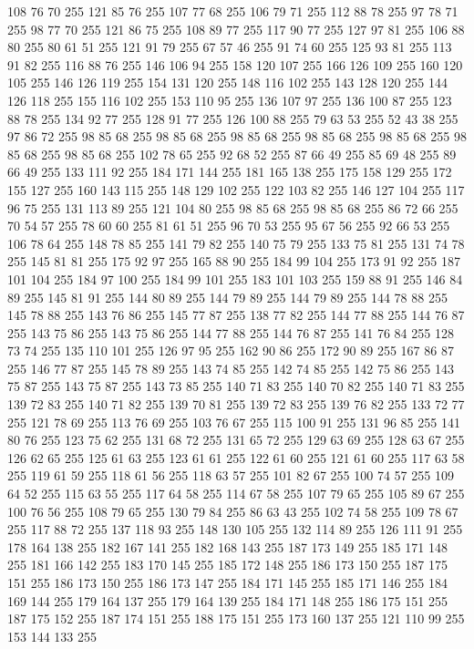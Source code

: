 108 76 70 255 121 85 76 255 107 77 68 255 106 79 71 255 112 88 78 255 97 78 71 255 98 77 70 255 121 86 75 255 108 89 77 255 117 90 77 255 127 97 81 255 106 88 80 255 80 61 51 255 121 91 79 255 67 57 46 255 91 74 60 255 125 93 81 255 113 91 82 255 116 88 76 255 146 106 94 255 158 120 107 255 166 126 109 255 160 120 105 255 146 126 119 255 154 131 120 255 148 116 102 255 143 128 120 255 144 126 118 255 155 116 102 255 153 110 95 255 136 107 97 255 136 100 87 255 123 88 78 255 134 92 77 255 128 91 77 255 126 100 88 255 79 63 53 255 52 43 38 255 97 86 72 255 98 85 68 255 98 85 68 255 98 85 68 255 98 85 68 255 98 85 68 255 98 85 68 255 98 85 68 255 102 78 65 255 92 68 52 255 87 66 49 255 85 69 48 255 89 66 49 255 133 111 92 255 184 171 144 255 181 165 138 255 175 158 129 255 172 155 127 255 160 143 115 255 148 129 102 255 122 103 82 255 146 127 104 255 117 96 75 255 131 113 89 255 121 104 80 255 98 85 68 255
98 85 68 255 86 72 66 255 70 54 57 255 78 60 60 255 81 61 51 255 96 70 53 255 95 67 56 255 92 66 53 255 106 78 64 255 148 78 85 255 141 79 82 255 140 75 79 255 133 75 81 255 131 74 78 255 145 81 81 255 175 92 97 255 165 88 90 255 184 99 104 255 173 91 92 255 187 101 104 255 184 97 100 255 184 99 101 255 183 101 103 255 159 88 91 255 146 84 89 255 145 81 91 255 144 80 89 255 144 79 89 255 144 79 89 255 144 78 88 255 145 78 88 255 143 76 86 255 145 77 87 255 138 77 82 255 144 77 88 255 144 76 87 255 143 75 86 255 143 75 86 255 144 77 88 255 144 76 87 255 141 76 84 255 128 73 74 255 135 110 101 255 126 97 95 255 162 90 86 255 172 90 89 255 167 86 87 255 146 77 87 255 145 78 89 255 143 74 85 255 142 74 85 255 142 75 86 255 143 75 87 255 143 75 87 255 143 73 85 255 140 71 83 255 140 70 82 255 140 71 83 255 139 72 83 255 140 71 82 255 139 70 81 255 139 72 83 255 139 76 82 255 133 72 77 255
121 78 69 255 113 76 69 255 103 76 67 255 115 100 91 255 131 96 85 255 141 80 76 255 123 75 62 255 131 68 72 255 131 65 72 255 129 63 69 255 128 63 67 255 126 62 65 255 125 61 63 255 123 61 61 255 122 61 60 255 121 61 60 255 117 63 58 255 119 61 59 255 118 61 56 255 118 63 57 255 101 82 67 255 100 74 57 255 109 64 52 255 115 63 55 255 117 64 58 255 114 67 58 255 107 79 65 255 105 89 67 255 100 76 56 255 108 79 65 255 130 79 84 255 86 63 43 255 102 74 58 255 109 78 67 255 117 88 72 255 137 118 93 255 148 130 105 255 132 114 89 255 126 111 91 255 178 164 138 255 182 167 141 255 182 168 143 255 187 173 149 255 185 171 148 255 181 166 142 255 183 170 145 255 185 172 148 255 186 173 150 255 187 175 151 255 186 173 150 255 186 173 147 255 184 171 145 255 185 171 146 255 184 169 144 255 179 164 137 255 179 164 139 255 184 171 148 255 186 175 151 255 187 175 152 255 187 174 151 255 188 175 151 255 173 160 137 255 121 110 99 255 153 144 133 255
